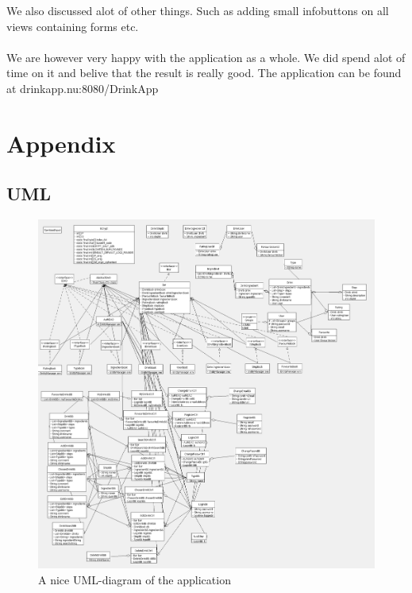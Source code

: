 \documentclass[a4paper]{article}
\begin{document}
We also discussed alot of other things. Such as adding small infobuttons on all views containing forms etc. \\
\\
We are however very happy with the application as a whole. We did spend alot of time on it and belive that the result is really good. The application can be found at drinkapp.nu:8080/DrinkApp

\section{Appendix}
\subsection{UML}

\begin{figure}[H]
  \begin{center}
    \includegraphics[width=1.3 \textwidth]{UML_final.png}
  \end{center}
  \caption{A nice UML-diagram of the application }
  \label{fig:awesomepicture}
\end{figure}
\end{document}

